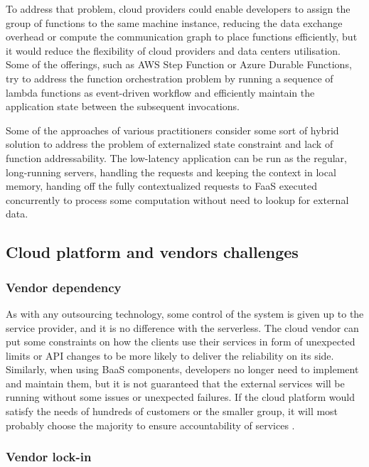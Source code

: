 To address that problem, cloud providers could enable developers to assign the group of functions to the same machine instance, reducing the data exchange overhead or compute the communication graph to place functions efficiently, but it would reduce the flexibility of cloud providers and data centers utilisation. Some of the offerings, such as AWS Step Function or Azure Durable Functions, try to address the function orchestration problem by running a sequence of lambda functions as event-driven workflow and efficiently maintain the application state between the subsequent invocations.

Some of the approaches of various practitioners consider some sort of hybrid solution to address the problem of externalized state constraint and lack of function addressability. The low-latency application can be run as the regular, long-running servers, handling the requests and keeping the context in local memory, handing off the fully contextualized requests to FaaS executed concurrently to process some computation without need to lookup for external data.

\subsection{Cloud platform and vendors challenges}

\subsubsection*{Vendor dependency}

As with any outsourcing technology, some control of the system is given up to the service provider, and it is no difference with the serverless. The cloud vendor can put some constraints on how the clients use their services in form of unexpected limits or API changes to be more likely to deliver the reliability on its side. Similarly, when using BaaS components, developers no longer need to implement and maintain them, but it is not guaranteed that the external services will be running without some issues or unexpected failures. If the cloud platform would satisfy the needs of hundreds of customers or the smaller group, it will most probably choose the majority to ensure accountability of services \cite{MartinFowlerServerless}.

\subsubsection*{Vendor lock-in}

